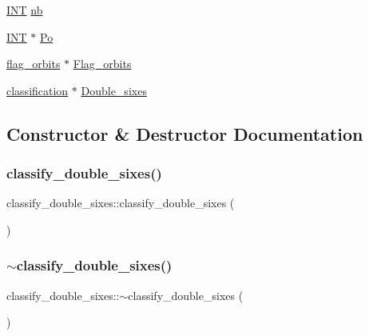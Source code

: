 \begin{DoxyCompactItemize}
\mbox{\hyperlink{galois_8h_a09fddde158a3a20bd2dcadb609de11dc}{I\+NT}} \mbox{\hyperlink{classclassify__double__sixes_a6f80667e7a882541b86e04727881b97d}{nb}}
\item 
\mbox{\hyperlink{galois_8h_a09fddde158a3a20bd2dcadb609de11dc}{I\+NT}} $\ast$ \mbox{\hyperlink{classclassify__double__sixes_a148db9f5624b1baa100f38305c1ff19f}{Po}}
\item 
\mbox{\hyperlink{classflag__orbits}{flag\+\_\+orbits}} $\ast$ \mbox{\hyperlink{classclassify__double__sixes_a49e8a20f697c9d8c150be83d875d79a3}{Flag\+\_\+orbits}}
\item 
\mbox{\hyperlink{classclassification}{classification}} $\ast$ \mbox{\hyperlink{classclassify__double__sixes_a31b3c0cd83d61ca610bc059b3a5ecc2f}{Double\+\_\+sixes}}
\end{DoxyCompactItemize}


\subsection{Constructor \& Destructor Documentation}
\mbox{\label{classclassify__double__sixes_acf03fec019f68b7fde956f33a600ad3e}} 
\subsubsection{\texorpdfstring{classify\+\_\+double\+\_\+sixes()}{classify\_double\_sixes()}}
{\footnotesize\ttfamily classify\+\_\+double\+\_\+sixes\+::classify\+\_\+double\+\_\+sixes (\begin{DoxyParamCaption}{ }\end{DoxyParamCaption})}

\mbox{\label{classclassify__double__sixes_aa5c5fe670215546d6d78f627b9aa66a0}} 
\subsubsection{\texorpdfstring{$\sim$classify\+\_\+double\+\_\+sixes()}{~classify\_double\_sixes()}}
{\footnotesize\ttfamily classify\+\_\+double\+\_\+sixes\+::$\sim$classify\+\_\+double\+\_\+sixes (\begin{DoxyParamCaption}{ }\end{DoxyParamCaption})}



